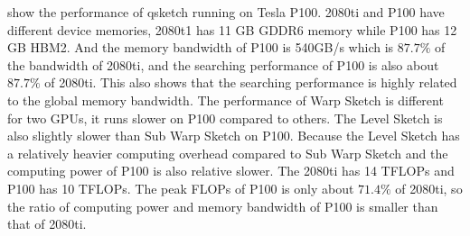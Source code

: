 \documentclass[conference]{IEEEtran}
\begin{document}
show the performance of qsketch running on Tesla P100. 2080ti and P100 have different device memories, 2080t1 has 11 GB GDDR6 memory while P100 has 12 GB HBM2. And the memory bandwidth of P100 is 540GB/s which is $87.7\%$ of the bandwidth of 2080ti, and the searching performance of P100 is also about $87.7\%$ of 2080ti. This also shows that the searching performance is highly related to the global memory bandwidth. The performance of Warp Sketch is different for two GPUs, it runs slower on P100 compared to others.
The Level Sketch is also slightly slower than Sub Warp Sketch on P100. Because the Level Sketch has a relatively heavier computing overhead compared to Sub Warp Sketch and the computing power of P100 is also relative slower. The 2080ti has 14 TFLOPs and P100 has 10 TFLOPs. The peak FLOPs of P100 is only about $71.4\%$ of 2080ti, so the ratio of computing power and memory bandwidth of P100 is smaller than that of 2080ti.


\end{document}
